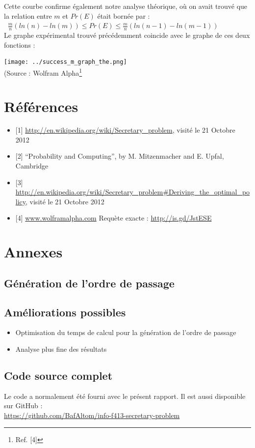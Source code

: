 \documentclass[a4paper,10pt]{article}
\begin{document}
Cette courbe confirme également notre analyse théorique, où on avait trouvé que la relation entre
\begin{math}m\end{math}
et
\begin{math}Pr(E)\end{math}
était bornée par :\\

\begin{math}\;\;\frac{m}{n} (ln(n) - ln(m)) \leq Pr(E) \leq \frac{m}{n} (ln(n-1) - ln(m-1))\end{math}\\

Le graphe expérimental trouvé précédemment coincide avec le graphe de ces deux fonctions :

\texttt{[image: ../success\_m\_graph\_the.png]}\\
(Source : Wolfram Alpha\footnote{Ref. [4]}

\section{Références}
\begin{itemize}
  \item {[}1] \url{http://en.wikipedia.org/wiki/Secretary_problem}, visité le 21 Octobre 2012
  \item {[}2] “Probability and Computing”, by M. Mitzenmacher and E. Upfal, Cambridge
  \item {[}3] \url{http://en.wikipedia.org/wiki/Secretary_problem#Deriving_the_optimal_policy}, visité le 21 Octobre 2012
  \item {[}4] \url{www.wolframalpha.com} Requète exacte : \url{http://is.gd/JstESE}
\end{itemize}
\section{Annexes}

\subsection{Génération de l'ordre de passage}

\subsection{Améliorations possibles}

\begin{itemize}
  \item Optimisation du temps de calcul pour la génération de l'ordre de passage
  \item Analyse plus fine des résultats
\end{itemize}


\subsection{Code source complet}
Le code a normalement été fourni avec le présent rapport. Il est aussi disponible sur GitHub :\\
\url{https://github.com/BafAltom/info-f413-secretary-problem}

\fontfamily{}
\end{document}
